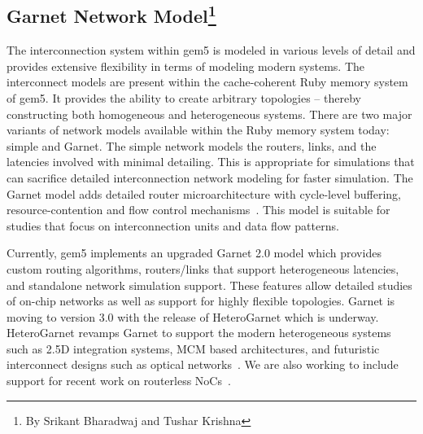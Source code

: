 \subsection[Garnet Network Model]{Garnet Network Model\footnote{By Srikant Bharadwaj and Tushar Krishna}}
\label{sec:garnet}

The interconnection system within gem5 is modeled in various levels of detail and provides extensive
flexibility in terms of modeling modern systems.
The interconnect models are present within the cache-coherent Ruby memory system of gem5.
It provides the ability to create arbitrary topologies – thereby constructing both homogeneous and heterogeneous systems.
There are two major variants of network models available within the Ruby memory system today: simple and Garnet.
The simple network models the routers, links, and the latencies involved with minimal detailing.
This is appropriate for simulations that can sacrifice detailed interconnection network modeling for faster simulation.
The Garnet model adds detailed router microarchitecture with cycle-level buffering, resource-contention and flow control mechanisms~\cite{garnet-2}.
This model is suitable for studies that focus on interconnection units and data flow patterns.

Currently, gem5 implements an upgraded Garnet 2.0 model which provides custom routing algorithms, routers/links that support heterogeneous latencies, and standalone network simulation support.
These features allow detailed studies of on-chip networks as well as support for highly flexible topologies.
Garnet is moving to version 3.0 with the release of HeteroGarnet which is underway.
HeteroGarnet revamps Garnet to support the modern heterogeneous systems such as 2.5D integration systems, MCM based architectures, and futuristic interconnect designs such as optical networks~\cite{kite}.
We are also working to include support for recent work on routerless NoCs~\cite{AlazemiABC18, LinPPC20}.

